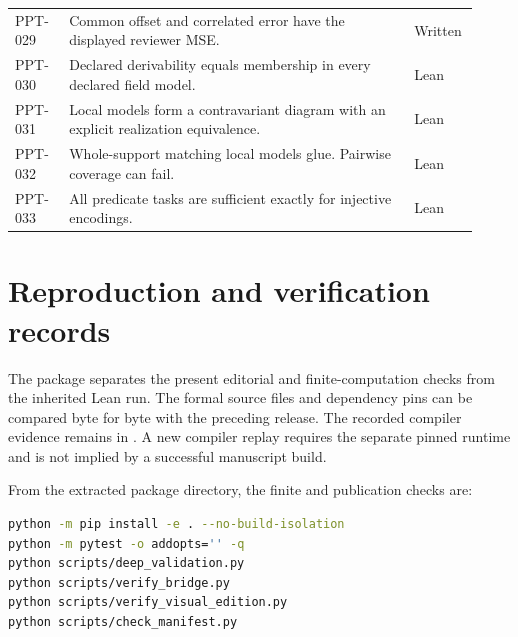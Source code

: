 \documentclass[11pt,oneside]{article}
\theoremstyle{komorebiplain}
\theoremstyle{komorebidefinition}
\theoremstyle{komorebiremark}
\begin{document}
\begin{longtable}{@{}L{0.115\linewidth}L{0.70\linewidth}L{0.105\linewidth}@{}}
PPT-029 & Common offset and correlated error have the displayed reviewer MSE. & {\sffamily\small\color{KomorebiTeal}Written}\\[5pt]
PPT-030 & Declared derivability equals membership in every declared field model. & {\sffamily\small\color{KomorebiTeal}Lean}\\[5pt]
PPT-031 & Local models form a contravariant diagram with an explicit realization equivalence. & {\sffamily\small\color{KomorebiTeal}Lean}\\[5pt]
PPT-032 & Whole-support matching local models glue. Pairwise coverage can fail. & {\sffamily\small\color{KomorebiTeal}Lean}\\[5pt]
PPT-033 & All predicate tasks are sufficient exactly for injective encodings. & {\sffamily\small\color{KomorebiTeal}Lean}\\[5pt]
\end{longtable}
\renewcommand{\arraystretch}{1.0}

\clearpage
\section{Reproduction and verification records}
\label{app:reproduction}

The package separates the present editorial and finite-computation checks from the inherited Lean run. The formal source files and dependency pins can be compared byte for byte with the preceding release. The recorded compiler evidence remains in . A new compiler replay requires the separate pinned runtime and is not implied by a successful manuscript build.

From the extracted package directory, the finite and publication checks are:
\begin{lstlisting}[language=bash]
python -m pip install -e . --no-build-isolation
python -m pytest -o addopts='' -q
python scripts/deep_validation.py
python scripts/verify_bridge.py
python scripts/verify_visual_edition.py
python scripts/check_manifest.py
\end{lstlisting}
\end{document}
